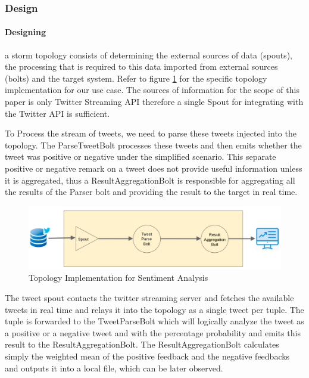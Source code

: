 \documentclass[runningheads,a4paper]{llncs}[2015/06/24]
\begin{document}
\subsubsection{Design}
\paragraph{Designing} a storm topology consists of determining the external sources of data (spouts), the processing that is required to this data imported from external sources (bolts) and the target system. Refer to figure \ref{fig:topoimpl} for the specific topology implementation for our use case. The sources of information for the scope of this paper is only Twitter Streaming API therefore a single Spout for integrating with the Twitter API is sufficient.

To Process the stream of tweets, we need to parse these tweets injected into the topology. The ParseTweetBolt processes these tweets and then emits whether the tweet was positive or negative under the simplified scenario. This separate positive or negative remark on a tweet does not provide useful information unless it is aggregated, thus a ResultAggregationBolt is responsible for aggregating all the results of the Parser bolt and providing the result to the target in real time.

\begin{figure}
  \begin{center}
    \includegraphics[width=\textwidth]{topoimpl.png}
    \caption{Topology Implementation for Sentiment Analysis}
    \label{fig:topoimpl}
   \end{center}
\end{figure}

The tweet spout contacts the twitter streaming server and fetches the available tweets in real time and relays it into the topology as a single tweet per tuple. The tuple is forwarded to the TweetParseBolt which will logically analyze the tweet as a positive or a negative tweet and with the percentage probability and emits this result to the ResultAggregationBolt. The ResultAggregationBolt calculates simply the weighted mean of the positive feedback and the negative feedbacks and outputs it into a local file, which can be later observed.
\end{document}
